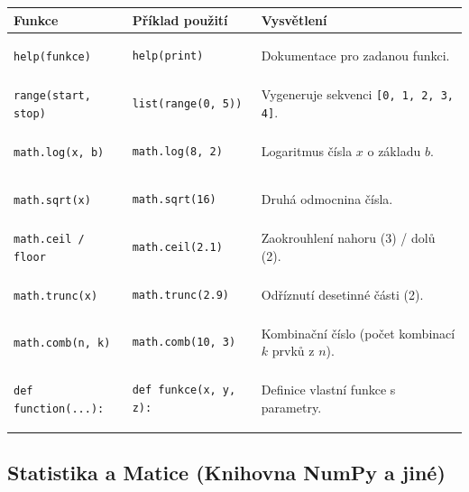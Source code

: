 \documentclass[a4paper, 11pt]{article}
\newenvironment{funkcedict}
{%
  \begingroup
  \renewcommand{\arraystretch}{1.4}%
  \lstset{basicstyle=\ttfamily\small, columns=fullflexible}%
  \setlength{\tabcolsep}{4pt}%
  \begin{tabular}{p{0.19\textwidth} p{0.38\textwidth} p{0.30\textwidth}}
  \textbf{Funkce} & \textbf{Příklad použití} & \textbf{Vysvětlení} \\
  \midrule
}
{%
  \end{tabular}%
  \endgroup
}
\begin{document}
\begin{funkcedict}
	\texttt{help(funkce)} &
	\begin{lstlisting}
help(print)
	\end{lstlisting}
	& Dokumentace pro zadanou funkci. \\
	\texttt{range(start, stop)} &
	\begin{lstlisting}
list(range(0, 5))
	\end{lstlisting}
	& Vygeneruje sekvenci \texttt{[0, 1, 2, 3, 4]}. \\
	\texttt{math.log(x, b)} &
	\begin{lstlisting}
math.log(8, 2)
	\end{lstlisting}
	& Logaritmus čísla $x$ o základu $b$. \\
	\texttt{math.sqrt(x)} &
	\begin{lstlisting}
math.sqrt(16)
	\end{lstlisting}
	& Druhá odmocnina čísla. \\
	\texttt{math.ceil / floor} &
	\begin{lstlisting}
math.ceil(2.1)
	\end{lstlisting}
	& Zaokrouhlení nahoru (3) / dolů (2). \\
	\texttt{math.trunc(x)} &
	\begin{lstlisting}
math.trunc(2.9)
	\end{lstlisting}
	& Odříznutí desetinné části (2). \\
	\texttt{math.comb(n, k)} &
	\begin{lstlisting}
math.comb(10, 3)
	\end{lstlisting}
	& Kombinační číslo (počet kombinací $k$ prvků z $n$). \\
	\texttt{def function(...):} &
	\begin{lstlisting}
def funkce(x, y, z):
	\end{lstlisting}
	& Definice vlastní funkce s parametry. \\
\end{funkcedict}
\subsection{Statistika a Matice (Knihovna NumPy a jiné)}
\end{document}
